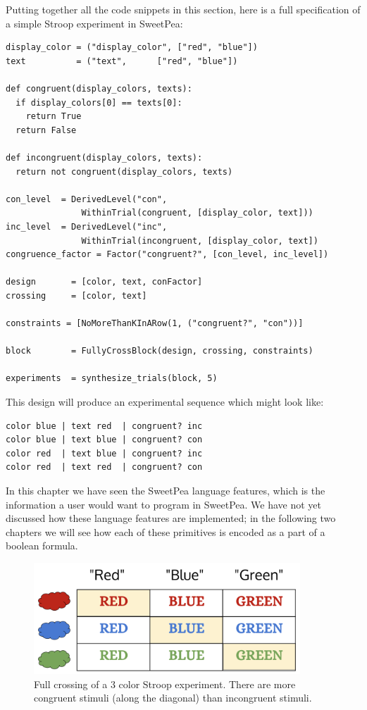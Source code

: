 Putting together all the code snippets in this section, here is a full specification of a simple Stroop experiment in SweetPea:

\begin{verbatim}
display_color = ("display_color", ["red", "blue"])
text          = ("text",      ["red", "blue"])

def congruent(display_colors, texts):
  if display_colors[0] == texts[0]:
    return True
  return False

def incongruent(display_colors, texts):
  return not congruent(display_colors, texts)

con_level  = DerivedLevel("con",
               WithinTrial(congruent, [display_color, text]))
inc_level  = DerivedLevel("inc",
               WithinTrial(incongruent, [display_color, text])
congruence_factor = Factor("congruent?", [con_level, inc_level])

design       = [color, text, conFactor]
crossing     = [color, text]

constraints = [NoMoreThanKInARow(1, ("congruent?", "con"))]

block        = FullyCrossBlock(design, crossing, constraints)

experiments  = synthesize_trials(block, 5)
\end{verbatim}

This design will produce an experimental sequence which might look like:

\begin{verbatim}
color blue | text red  | congruent? inc
color blue | text blue | congruent? con
color red  | text blue | congruent? inc
color red  | text red  | congruent? con
\end{verbatim}


In this chapter we have seen the SweetPea language features, which is the information a user would want to program in SweetPea. We have not yet discussed how these language features are implemented; in the following two chapters we will see how each of these primitives is encoded as a part of a boolean formula.


\begin{figure}
    \centerline{\includegraphics[origin=c,width=10cm]{fig_weighted_crossing}}
    \caption{Full crossing of a 3 color Stroop experiment. There are more congruent stimuli (along the diagonal) than incongruent stimuli.}%
    \label{fig:weighted_crossing}%
\end{figure}

